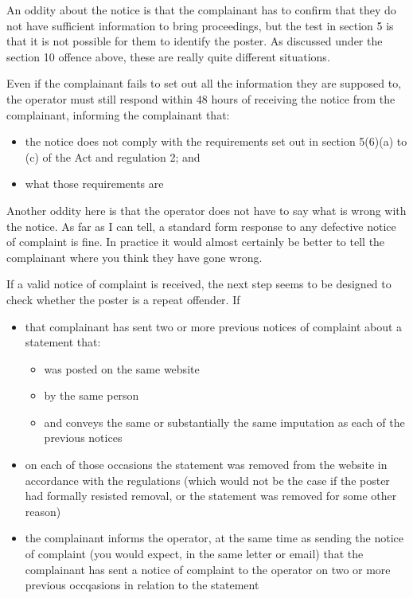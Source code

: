 \documentclass[]{article}
\begin{document}
An oddity about the notice is that the complainant has to confirm that they do not have sufficient information to bring proceedings, but the test in section 5 is that it is not possible for them to identify the poster. As discussed under the section 10 offence above, these are really quite different situations.

Even if the complainant fails to set out all the information they are supposed to, the operator must still respond within 48 hours of receiving the notice from the complainant, informing the complainant that:

\begin{itemize}
\item the notice does not comply with the requirements set out in section 5(6)(a) to (c) of the Act and regulation 2; and
\item what those requirements are
\end{itemize}

Another oddity here is that the operator does not have to say what is wrong with the notice. As far as I can tell, a standard form response to any defective notice of complaint is fine. In practice it would almost certainly be better to tell the complainant where you think they have gone wrong.

If a valid notice of complaint is received, the next step seems to be designed to check whether the poster is a repeat offender. If

\begin{itemize}
\item that complainant has sent two or more previous notices of complaint about a statement that:
  \begin{itemize}
  \item was posted on the same website
  \item by the same person
  \item and conveys the same or substantially the same imputation as each of the previous notices
  \end{itemize}
\item on each of those occasions the statement was removed from the website in accordance with the regulations (which would not be the case if the poster had formally resisted removal, or the statement was removed for some other reason)
\item the complainant informs the operator, at the same time as sending the notice of complaint (you would expect, in the same letter or email) that the complainant has sent a notice of complaint to the operator on two or more previous occqasions in relation to the statement
\end{itemize}
\end{document}
